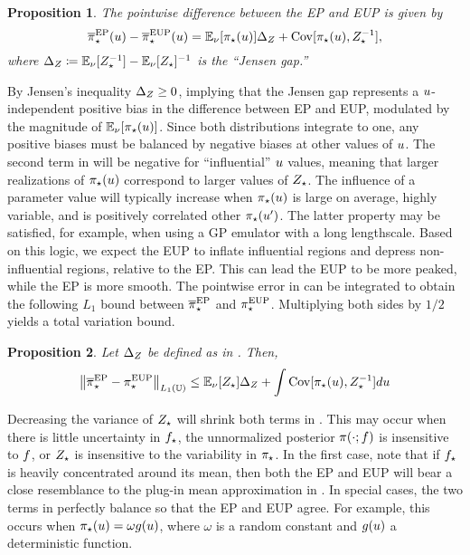 \documentclass[12pt]{article}
\newtheorem{prop}{Proposition}
\begin{document}
\begin{prop} \label{prop:ep-eup-pw-err}
The pointwise difference between the EP and EUP is given by
\begin{equation}
{\overline{\pi}}_{\star}^{\mathrm{EP}}(u) - {\overline{\pi}}_{\star}^{\mathrm{EUP}}(u)
= \mathbb{E}_{\nu}[{\pi}_{\star}(u)] \Delta_Z + \mathrm{Cov}[{\pi}_{\star}(u), {Z}_{\star}^{-1}],
\label{eq:ep-eup-pw-err}
\end{equation}
where $\Delta_Z \coloneqq \mathbb{E}_{\nu}[{Z}_{\star}^{-1}] - \mathbb{E}_{\nu}[{Z}_{\star}]^{-1}$
is the ``Jensen gap.''
\end{prop}

By Jensen's inequality $\Delta_Z \geq 0$, implying that the Jensen gap represents a 
$u$-independent positive bias in the difference between EP and EUP, modulated by the magnitude of 
$\mathbb{E}_{\nu}[{\pi}_{\star}(u)]$. Since both distributions integrate to one, any positive 
biases must be balanced by negative biases at other values of $u$.
The second term in  will be negative for ``influential'' $u$ values, 
meaning that larger realizations of ${\pi}_{\star}(u)$ correspond to larger values of 
${Z}_{\star}$. The influence of a parameter value will typically increase when 
${\pi}_{\star}(u)$ is large on average, highly variable, and is positively correlated other 
${\pi}_{\star}(u^\prime)$. The latter property may be satisfied, for example, when using 
a GP emulator with a long lengthscale. Based on this logic, we expect the EUP to inflate 
influential regions and depress non-influential regions, relative to the EP. This can lead 
the EUP to be more peaked, while the EP is more smooth. The pointwise error in 
 can be integrated to obtain the following $L_1$ bound 
between ${\overline{\pi}}_{\star}^{\mathrm{EP}}$ and ${\pi}_{\star}^{\mathrm{EUP}}$. Multiplying both sides by $1/2$
yields a total variation bound.

\begin{prop} \label{prop:ep-eup-TV-err}
Let $\Delta_Z$ be defined as in . Then,
\begin{equation}
\left\lVert{\overline{\pi}}_{\star}^{\mathrm{EP}} - {\pi}_{\star}^{\mathrm{EUP}}\right\rVert_{L_1(\mathbb{U})}
\leq \mathbb{E}_{\nu}[{Z}_{\star}] \Delta_Z + \int \mathrm{Cov}[{\pi}_{\star}(u), {Z}_{\star}^{-1}] du
\label{eq:ep-eup-TV-err}
\end{equation}
\end{prop}

Decreasing the variance of ${Z}_{\star}$ will shrink both terms in 
. This may occur when there is little 
uncertainty in ${f}_{\star}$, the unnormalized posterior $\pi(\cdot; f)$
is insensitive to $f$, or ${Z}_{\star}$ is insensitive to the variability 
in ${\pi}_{\star}$. In the first case, note that if ${f}_{\star}$ is heavily 
concentrated around its mean, then both the EP and EUP will bear a close resemblance
to the plug-in mean approximation in .
In special cases, the two terms in  perfectly balance so that 
the EP and EUP agree. For example, this occurs when 
${\pi}_{\star}(u) = \omega g(u)$, where $\omega$ is a random constant and 
$g(u)$ a deterministic function. 
\end{document}
